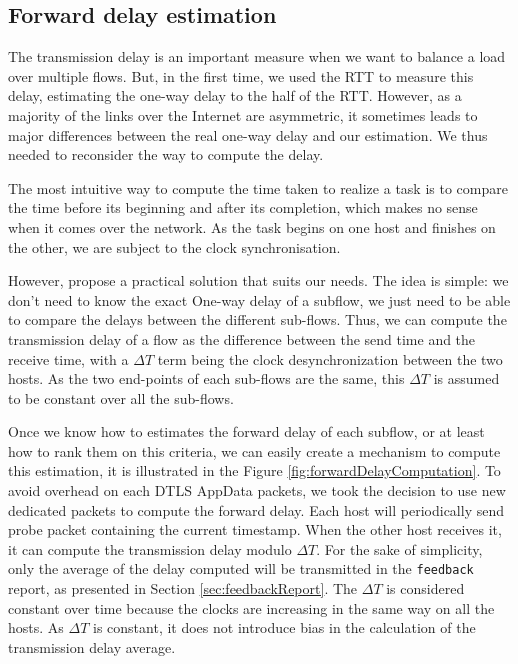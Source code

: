 \subsection{Forward delay estimation}
The transmission delay is an important measure when we want to balance a load over multiple flows. But, in the first time, we used the RTT to measure this delay, estimating the one-way delay to the half of the RTT. However, as a majority of the links over the Internet are asymmetric, it sometimes leads to major differences between the real one-way delay and our estimation. We thus needed to reconsider the way to compute the delay.

The most intuitive way to compute the time taken to realize a task is to compare the time before its beginning and after its completion, which makes no sense when it comes over the network. As the task begins on one host and finishes on the other, we are subject to the clock synchronisation.

However, \cite{song2009estimator} propose a practical solution that suits our needs. The idea is simple: we don't need to know the exact One-way delay of a subflow, we just need to be able to compare the delays between the different sub-flows. Thus, we can compute the transmission delay of a flow as the difference between the send time and the receive time, with a $\Delta T$ term being the clock desynchronization between the two hosts. As the two end-points of each sub-flows are the same, this $\Delta T$ is assumed to be constant over all the sub-flows.

Once we know how to estimates the forward delay of each subflow, or at least how to rank them on this criteria, we can easily create a mechanism to compute this estimation, it is illustrated in the Figure \ref{fig:forwardDelayComputation}. To avoid overhead on each DTLS AppData packets, we took the decision to use new dedicated packets to compute the forward delay. Each host will periodically send probe packet containing the current timestamp. When the other host receives it, it can compute the transmission delay modulo $\Delta T$. For the sake of simplicity, only the average of the delay computed will be transmitted in the \verb!feedback! report, as presented in Section \ref{sec:feedbackReport}. The $\Delta T$ is considered constant over time because the clocks are increasing in the same way on all the hosts. As $\Delta T$ is constant, it does not introduce bias in the calculation of the transmission delay average.

